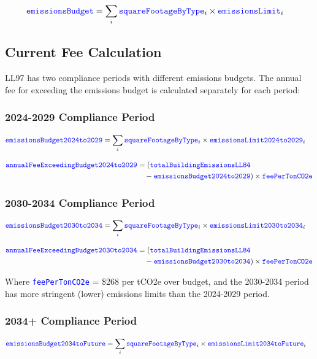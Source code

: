 \documentclass{article}
\newcommand{\code}[1]{\textcolor{blue}{\texttt{#1}}}
\begin{document}
\begin{align}
\code{emissionsBudget} &= \sum_{i} \code{squareFootageByType}_i \times \code{emissionsLimit}_i
\end{align}

\subsection{Current Fee Calculation}

LL97 has two compliance periods with different emissions budgets. The annual fee for exceeding the emissions budget is calculated separately for each period:

\subsubsection{2024-2029 Compliance Period}
\begin{align}
\code{emissionsBudget2024to2029} &= \sum_{i} \code{squareFootageByType}_i \times \code{emissionsLimit2024to2029}_i
\end{align}

\begin{align}
\code{annualFeeExceedingBudget2024to2029} &= (\code{totalBuildingEmissionsLL84} \nonumber\\
&\quad - \code{emissionsBudget2024to2029}) \times \code{feePerTonCO2e}
\end{align}

\subsubsection{2030-2034 Compliance Period}
\begin{align}
\code{emissionsBudget2030to2034} &= \sum_{i} \code{squareFootageByType}_i \times \code{emissionsLimit2030to2034}_i
\end{align}

\begin{align}
\code{annualFeeExceedingBudget2030to2034} &= (\code{totalBuildingEmissionsLL84} \nonumber\\
&\quad - \code{emissionsBudget2030to2034}) \times \code{feePerTonCO2e}
\end{align}

Where \code{feePerTonCO2e} = \$268 per tCO2e over budget, and the 2030-2034 period has more stringent (lower) emissions limits than the 2024-2029 period.

\subsubsection{2034+ Compliance Period}
\begin{align}
\code{emissionsBudget2034toFuture} &= \sum_{i} \code{squareFootageByType}_i \times \code{emissionsLimit2034toFuture}_i
\end{align}
\end{document}
